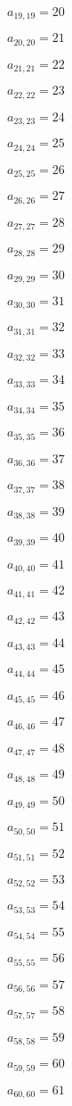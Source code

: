 \documentclass[a4paper,12pt]{article}
\begin{document}
$a _{ 19, 19 } = 20$

$a _{ 20, 20 } = 21$

$a _{ 21, 21 } = 22$

$a _{ 22, 22 } = 23$

$a _{ 23, 23 } = 24$

$a _{ 24, 24 } = 25$

$a _{ 25, 25 } = 26$

$a _{ 26, 26 } = 27$

$a _{ 27, 27 } = 28$

$a _{ 28, 28 } = 29$

$a _{ 29, 29 } = 30$

$a _{ 30, 30 } = 31$

$a _{ 31, 31 } = 32$

$a _{ 32, 32 } = 33$

$a _{ 33, 33 } = 34$

$a _{ 34, 34 } = 35$

$a _{ 35, 35 } = 36$

$a _{ 36, 36 } = 37$

$a _{ 37, 37 } = 38$

$a _{ 38, 38 } = 39$

$a _{ 39, 39 } = 40$

$a _{ 40, 40 } = 41$

$a _{ 41, 41 } = 42$

$a _{ 42, 42 } = 43$

$a _{ 43, 43 } = 44$

$a _{ 44, 44 } = 45$

$a _{ 45, 45 } = 46$

$a _{ 46, 46 } = 47$

$a _{ 47, 47 } = 48$

$a _{ 48, 48 } = 49$

$a _{ 49, 49 } = 50$

$a _{ 50, 50 } = 51$

$a _{ 51, 51 } = 52$

$a _{ 52, 52 } = 53$

$a _{ 53, 53 } = 54$

$a _{ 54, 54 } = 55$

$a _{ 55, 55 } = 56$

$a _{ 56, 56 } = 57$

$a _{ 57, 57 } = 58$

$a _{ 58, 58 } = 59$

$a _{ 59, 59 } = 60$

$a _{ 60, 60 } = 61$
\end{document}
